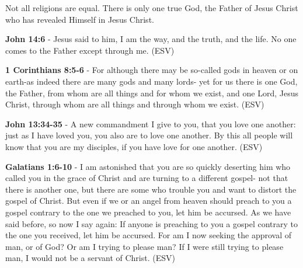 \documentclass[11pt]{article}
\begin{document}
Not all religions are equal.
There is only one true God, the Father of Jesus Christ who has revealed Himself in Jesus Christ.

\textbf{John 14:6} - Jesus said to him, I am the way, and the truth, and the life. No one comes to the Father except through me. (ESV)

\textbf{1 Corinthians 8:5-6} - For although there may be so-called gods in heaven or on earth-as indeed there are many gods and many lords- yet for us there is one God, the Father, from whom are all things and for whom we exist, and one Lord, Jesus Christ, through whom are all things and through whom we exist. (ESV)

\textbf{John 13:34-35} - A new commandment I give to you, that you love one another: just as I have loved you, you also are to love one another. By this all people will know that you are my disciples, if you have love for one another. (ESV)

\textbf{Galatians 1:6-10} - I am astonished that you are so quickly deserting him who called you in the grace of Christ and are turning to a different gospel- not that there is another one, but there are some who trouble you and want to distort the gospel of Christ. But even if we or an angel from heaven should preach to you a gospel contrary to the one we preached to you, let him be accursed. As we have said before, so now I say again: If anyone is preaching to you a gospel contrary to the one you received, let him be accursed. For am I now seeking the approval of man, or of God? Or am I trying to please man? If I were still trying to please man, I would not be a servant of Christ. (ESV)
\end{document}
